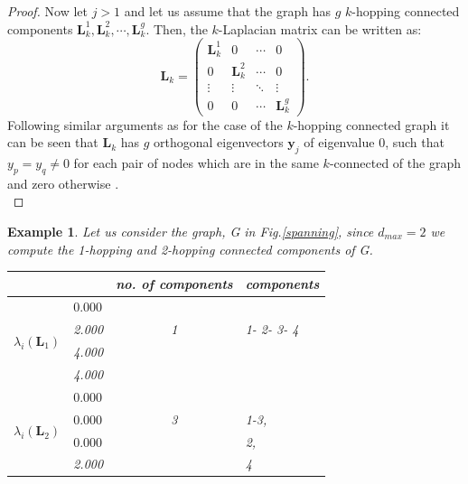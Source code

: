 \documentclass[10pt,a4paper]{article}
\newtheorem{exa}{Example}
\begin{document}
\begin{proof}
    	    	Now let $j>1$ and let us assume that the graph has $g$ $k$-hopping connected components $\mathbf{L}_{k}^1,\mathbf{L}_{k}^2,\cdots, \mathbf{L}_{k}^g $. Then, the $k$-Laplacian matrix can be written as:
    	    	\begin{equation*}
    	    	\mathbf{L}_k = \begin{pmatrix}
    	    	\mathbf{L}_{k}^1 & 0 & \cdots & 0 \\
    	    	0 & \mathbf{L}_{k}^2 & \cdots & 0\\
    	    	\vdots& \vdots & \ddots & \vdots \\
    	    	0 & 0 & \cdots & \mathbf{L}_{k}^g
    	    	\end{pmatrix}.
    	    	\end{equation*}
    	    	Following similar arguments as for the case of the $k$-hopping connected graph it can be seen that $\mathbf{L}_k$ has $g$ orthogonal eigenvectors $\mathbf{y}_j$ of eigenvalue $0$, such that $y_p = y_q \neq 0$ for each pair of nodes which are in the same $k$-connected of the graph and zero otherwise \citep{estrada2012path}.\\  	
    	    \end{proof}
    	    
    	    \begin{exa}
    	    	Let us consider the graph, G in Fig.\ref{spanning}, since $d_{max} = 2$ we compute the 1-hopping and 2-hopping connected components of G.
    	    	
    	    	\begin{table}[H]
    	    		\centering
    	    		\begin{tabular}{ |l|l|c|l| }
    	    			\hline
    	    			& & no. of components & components \\
    	    			\hline
    	    			\multirow{4}{*}{$\lambda_i(\mathbf{L}_1)$} & $\mathbf{0.000}$& & \\
    	    			& 2.000& 1& 1- 2- 3- 4\\
    	    			& 4.000 & & \\
    	    			& 4.000 & & \\ \hline
    	    			\multirow{4}{*}{$\lambda_i(\mathbf{L}_2)$} & $\mathbf{0.000}$& & \\
    	    			& $\mathbf{0.000}$& 3 & 1-3,\\
    	    			& $\mathbf{0.000}$ &  & 2,\\
    	    			& 2.000 &  & 4\\
    	    			\hline
    	    		\end{tabular}   
    	    	\end{table}
    	    	
    	    	
    	    \end{exa}
\end{document}
